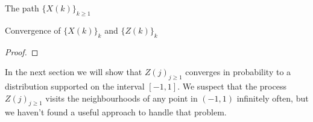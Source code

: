 \documentclass[12pt]{article}
\newenvironment{remark}[1][Remark]{\begin{trivlist}
		\item[\hskip \labelsep {\bfseries #1}]}{\end{trivlist}}
\begin{document}
\begin{section}{The path $\{X(k)\}_{k\ge1}$ }
\begin{subsection}{Convergence of $\{X(k)\}_k$ and $\{Z(k)\}_k$}
\begin{proof}
\end{proof}

\begin{remark}
	
	
In the next section we will show that ${Z(j)}_{j\ge 1}$ converges in probability to a distribution supported on the interval $[-1,1]$. We suspect that the process ${Z(j)}_{j\ge 1}$ visits the neighbourhoods of any point in $(-1,1)$ infinitely often, but we haven't found a useful approach to handle that problem.  
\end{remark}

\end{subsection}


\end{section}

\end{document}
